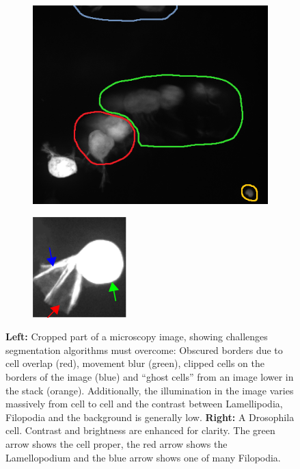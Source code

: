 \begin {figure}[!htb]	
	\centering
	\begin {subfigure}[t]{0.50\linewidth}
		\includegraphics[scale=0.55]{img/fig_problems.png}
	\end {subfigure}
	\hspace{1cm}
	\begin {subfigure}[t]{0.40\linewidth}
		\includegraphics[scale=1.470]{img/fig_cell_example.png}
	\end {subfigure}

	\caption[Segmentation challenges and cell parts.]{\textbf{Left:} Cropped part of a microscopy image, showing challenges segmentation algorithms must overcome: Obscured borders due to cell overlap (red), movement blur (green), clipped cells on the borders of the image (blue) and ``ghost cells'' from an image lower in the stack (orange). Additionally, the illumination in the image varies massively from cell to cell and the contrast between Lamellipodia, Filopodia and the background is generally low. \textbf{Right:} A Drosophila cell. Contrast and brightness are enhanced for clarity. The green arrow shows the cell proper, the red arrow shows the Lamellopodium and the blue arrow shows one of many Filopodia.}
	\label{fig:cell_example}
\end {figure}

